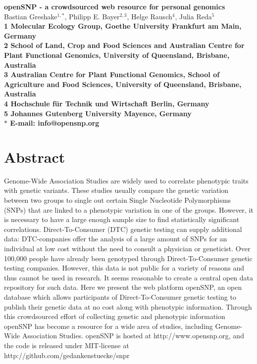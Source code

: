 \documentclass[10pt]{article}
\date{}
\begin{document}
\begin{flushleft}
{\Large
\textbf{openSNP - a crowdsourced web resource for personal genomics}
}
% 
\\
Bastian Greshake$^{1,\ast}$, 
Philipp E. Bayer$^{2,3}$, 
Helge Rausch$^{4}$,
Julia Reda$^{5}$
\\
\bf{1} Molecular Ecology Group, Goethe University Frankfurt am Main, Germany
\\
\bf{2} School of Land, Crop and Food Sciences and Australian Centre for Plant Functional Genomics, University of Queensland, Brisbane, Australia
\\
\bf{3} Australian Centre for Plant Functional Genomics, School of Agriculture and Food Sciences, University of Queensland, Brisbane, Australia
\\
\bf{4} Hochschule f\"ur Technik und Wirtschaft Berlin, Germany 
\\
\bf{5} Johannes Gutenberg University Mayence, Germany
\\
$\ast$ E-mail: info@opensnp.org
\end{flushleft}

\section*{Abstract}
Genome-Wide Association Studies are widely used to correlate phenotypic traits with genetic variants. These studies usually compare the genetic variation between two groups to single out certain Single Nucleotide Polymorphisms (SNPs) that are linked to a phenotypic variation in one of the groups. However, it is necessary to have a large enough sample size to find statistically significant correlations. Direct-To-Consumer (DTC) genetic testing can supply additional data: DTC-companies offer the analysis of a large amount of SNPs for an individual at low cost without the need to consult a physician or geneticist. Over 100,000 people have already been genotyped through Direct-To-Consumer genetic testing companies. However, this data is not public for a variety of reasons and thus cannot be used in research. It seems reasonable to create a central open data repository for such data.
Here we present the web platform openSNP, an open database which allows participants of Direct-To-Consumer genetic testing to publish their genetic data at no cost along with phenotypic information. Through this crowdsourced effort of collecting genetic and phenotypic information openSNP has become a 
resource for a wide area of studies, including Genome-Wide Association Studies. openSNP is hosted at http://www.opensnp.org, and the code is released under MIT-license at http://github.com/gedankenstuecke/snpr
\end{document}
